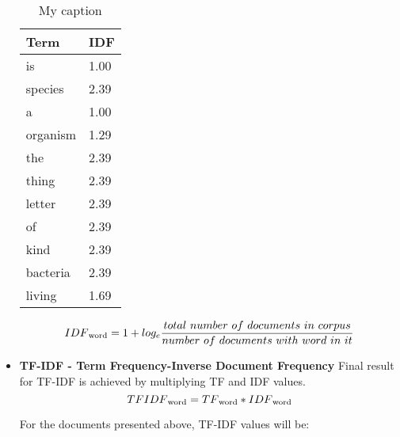 \begin{itemize}
	
	\begin{table}[H]
		\centering
		\caption{My caption}
		\label{my-label}
		\begin{tabular}{@{}ll@{}}
			\toprule
			Term     & IDF  \\ \midrule
			is       & 1.00 \\
			species  & 2.39 \\
			a        & 1.00 \\
			organism & 1.29 \\
			the      & 2.39 \\
			thing    & 2.39 \\
			letter   & 2.39 \\
			of       & 2.39 \\
			kind     & 2.39 \\
			bacteria & 2.39 \\
			living   & 1.69 \\ \bottomrule
		\end{tabular}
	\end{table}
	
		\[IDF\textsubscript{word}=1+log_e \frac{total\ number\ of\ documents\ in\ corpus}{number\ of\ documents\ with\ word\ in\ it}\]

	\item \textbf{TF-IDF - Term Frequency-Inverse Document Frequency}
	Final result for TF-IDF is achieved by multiplying TF and IDF values.
	\[TFIDF\textsubscript{word}=TF\textsubscript{word} * IDF\textsubscript{word}\]
	
	For the documents presented above, TF-IDF values will be:


\end{itemize}
